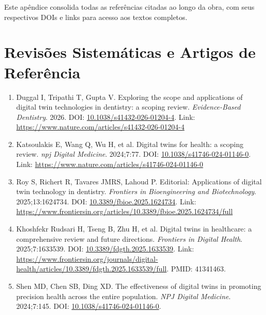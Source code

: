 
Este apêndice consolida todas as referências citadas ao longo da obra, com seus respectivos DOIs e links para acesso aos textos completos.

\section{Revisões Sistemáticas e Artigos de Referência}

\begin{enumerate}
    \item \label{ref:duggal2026} Duggal I, Tripathi T, Gupta V. Exploring the scope and applications of digital twin technologies in dentistry: a scoping review. \textit{Evidence-Based Dentistry}. 2026. DOI: \href{https://doi.org/10.1038/s41432-026-01204-4}{10.1038/s41432-026-01204-4}. Link: \url{https://www.nature.com/articles/s41432-026-01204-4}
    
    \item \label{ref:katsoulakis2024} Katsoulakis E, Wang Q, Wu H, et al. Digital twins for health: a scoping review. \textit{npj Digital Medicine}. 2024;7:77. DOI: \href{https://doi.org/10.1038/s41746-024-01146-0}{10.1038/s41746-024-01146-0}. Link: \url{https://www.nature.com/articles/s41746-024-01146-0}
    
    \item \label{ref:roy2025} Roy S, Richert R, Tavares JMRS, Lahoud P. Editorial: Applications of digital twin technology in dentistry. \textit{Frontiers in Bioengineering and Biotechnology}. 2025;13:1624734. DOI: \href{https://doi.org/10.3389/fbioe.2025.1624734}{10.3389/fbioe.2025.1624734}. Link: \url{https://www.frontiersin.org/articles/10.3389/fbioe.2025.1624734/full}
    
    \item \label{ref:khoshfekr2025} Khoshfekr Rudsari H, Tseng B, Zhu H, et al. Digital twins in healthcare: a comprehensive review and future directions. \textit{Frontiers in Digital Health}. 2025;7:1633539. DOI: \href{https://doi.org/10.3389/fdgth.2025.1633539}{10.3389/fdgth.2025.1633539}. Link: \url{https://www.frontiersin.org/journals/digital-health/articles/10.3389/fdgth.2025.1633539/full}. PMID: 41341463.
    
    \item \label{ref:shen2024} Shen MD, Chen SB, Ding XD. The effectiveness of digital twins in promoting precision health across the entire population. \textit{NPJ Digital Medicine}. 2024;7:145. DOI: \href{https://doi.org/10.1038/s41746-024-01146-0}{10.1038/s41746-024-01146-0}.
\end{enumerate}

